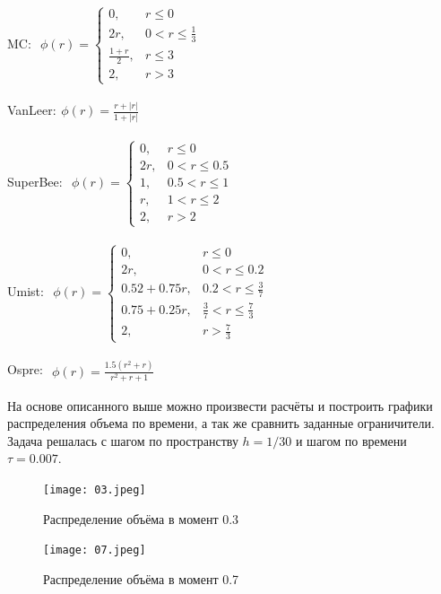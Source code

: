 MC: $
\begin{aligned}
     \phi(r)=\begin{cases}
	0, &r\leq0\\
	2r, &0<r\leq\frac{1}{3}\\
	\frac{1+r}{2}, &r\leq3\\
	2, &r>3
    \end{cases}
\end{aligned}
$ 


VanLeer:$
\begin{aligned}
    \phi(r)=\frac{r+|r|}{1+|r|}
\end{aligned}
$


SuperBee: $
\begin{aligned}
    \phi(r)=\begin{cases}
	0, &r\leq 0\\
	2r, &0<r\leq 0.5\\
	1, &0.5<r\leq 1\\
	r, &1<r\leq 2\\
	2, &r>2
    \end{cases}
\end{aligned}
$


Umist: $
\begin{aligned}
    \phi(r)=\begin{cases}
	0, &r\leq 0\\
	2r, &0<r\leq 0.2\\
	0.52+0.75r, &0.2<r\leq \frac{3}{7}\\
	0.75+0.25r, &\frac{3}{7}<r\leq \frac{7}{3}\\
	2, &r>\frac{7}{3}
    \end{cases}
\end{aligned}
$


Ospre: $
\begin{aligned}
   \phi(r)=
    \frac{1.5(r^2+r)}{r^2+r+1}
\end{aligned}
$


На основе описанного выше можно произвести расчёты и построить графики распределения объема по времени, а так же сравнить
заданные ограничители.
Задача решалась с шагом по пространству $h=1/30$ и шагом по времени $\tau=0.007$.

\begin{figure}[h!]
    \centering
    \texttt{[image: 03.jpeg]}
    \caption{Распределение объёма в момент 0.3}
    \label{03}
\end{figure}

\begin{figure}[h!]
    \centering
     \texttt{[image: 07.jpeg]}
    \caption{Распределение объёма в момент 0.7}
    \label{07}
\end{figure}


